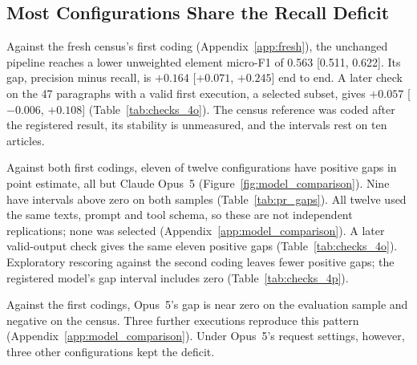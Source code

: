 

\subsection{Most Configurations Share the Recall Deficit}\label{subsec:recurrence}



\label{subsec:fresh_results}%
\enlargethispage{\baselineskip}%
Against the fresh census's first coding (Appendix~\ref{app:fresh}), the unchanged pipeline reaches a lower unweighted element micro-F1 of 0.563 [0.511, 0.622]. Its gap, precision minus recall, is $+0.164$ [$+0.071$, $+0.245$] end to end. A later check on the 47 paragraphs with a valid first execution, a selected subset, gives $+0.057$ [$-0.006$, $+0.108$] (Table~\ref{tab:checks_4o}). The census reference was coded after the registered result, its stability is unmeasured, and the intervals rest on ten articles.

\label{subsec:model_comparison}%
Against both first codings, eleven of twelve configurations have positive gaps in point estimate, all but Claude Opus~5 (Figure~\ref{fig:model_comparison}). Nine have intervals above zero on both samples (Table~\ref{tab:pr_gaps}). All twelve used the same texts, prompt and tool schema, so these are not independent replications; none was selected (Appendix~\ref{app:model_comparison}). A later valid-output check gives the same eleven positive gaps (Table~\ref{tab:checks_4o}). Exploratory rescoring against the second coding leaves fewer positive gaps; the registered model's gap interval includes zero (Table~\ref{tab:checks_4p}).

Against the first codings, Opus~5's gap is near zero on the evaluation sample and negative on the census. Three further executions reproduce this pattern (Appendix~\ref{app:model_comparison}). Under Opus~5's request settings, however, three other configurations kept the deficit.
